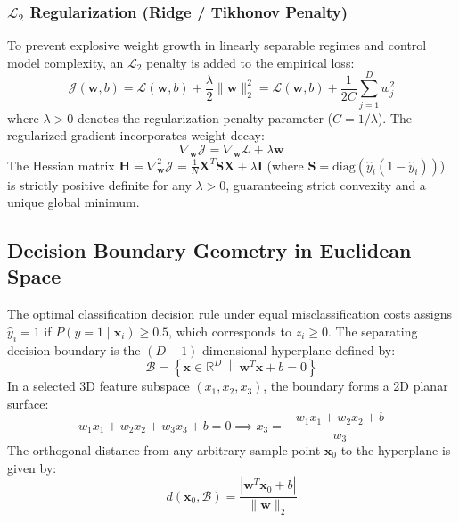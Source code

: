 \documentclass[12pt,a4paper]{article}
\begin{document}
\subsubsection{\texorpdfstring{$\mathcal{L}_2$ Regularization (Ridge / Tikhonov Penalty)}{L2 Regularization}}
To prevent explosive weight growth in linearly separable regimes and control model complexity, an $\mathcal{L}_2$ penalty is added to the empirical loss:
\begin{equation}
\mathcal{J}(\mathbf{w}, b) = \mathcal{L}(\mathbf{w}, b) + \frac{\lambda}{2} \|\mathbf{w}\|_2^2 = \mathcal{L}(\mathbf{w}, b) + \frac{1}{2C} \sum_{j=1}^D w_j^2
\end{equation}
where $\lambda > 0$ denotes the regularization penalty parameter ($C = 1/\lambda$). The regularized gradient incorporates weight decay:
\begin{equation}
\nabla_{\mathbf{w}} \mathcal{J} = \nabla_{\mathbf{w}} \mathcal{L} + \lambda \mathbf{w}
\end{equation}
The Hessian matrix $\mathbf{H} = \nabla_{\mathbf{w}}^2 \mathcal{J} = \frac{1}{N} \mathbf{X}^T \mathbf{S} \mathbf{X} + \lambda \mathbf{I}$ (where $\mathbf{S} = \text{diag}(\hat{y}_i(1-\hat{y}_i))$) is strictly positive definite for any $\lambda > 0$, guaranteeing strict convexity and a unique global minimum.

\subsection{Decision Boundary Geometry in Euclidean Space}
The optimal classification decision rule under equal misclassification costs assigns $\hat{y}_i = 1$ if $P(y=1 \mid \mathbf{x}_i) \ge 0.5$, which corresponds to $z_i \ge 0$. The separating decision boundary is the $(D-1)$-dimensional hyperplane defined by:
\begin{equation}
\mathcal{B} = \left\{ \mathbf{x} \in \mathbb{R}^D \;\middle|\; \mathbf{w}^T \mathbf{x} + b = 0 \right\}
\end{equation}
In a selected 3D feature subspace $(x_1, x_2, x_3)$, the boundary forms a 2D planar surface:
\begin{equation}
w_1 x_1 + w_2 x_2 + w_3 x_3 + b = 0 \implies x_3 = -\frac{w_1 x_1 + w_2 x_2 + b}{w_3}
\end{equation}
The orthogonal distance from any arbitrary sample point $\mathbf{x}_0$ to the hyperplane is given by:
\begin{equation}
d(\mathbf{x}_0, \mathcal{B}) = \frac{|\mathbf{w}^T \mathbf{x}_0 + b|}{\|\mathbf{w}\|_2}
\end{equation}
\end{document}
